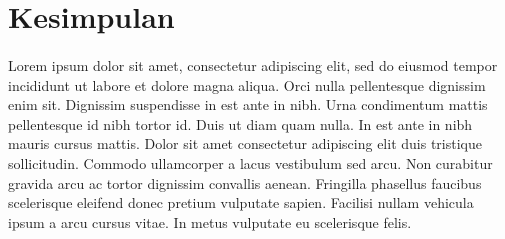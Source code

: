 \section{Kesimpulan}
\paragraph{}Lorem ipsum dolor sit amet, consectetur adipiscing elit, sed do eiusmod tempor incididunt ut labore et dolore magna aliqua. Orci nulla pellentesque dignissim enim sit. Dignissim suspendisse in est ante in nibh. Urna condimentum mattis pellentesque id nibh tortor id. Duis ut diam quam nulla. In est ante in nibh mauris cursus mattis. Dolor sit amet consectetur adipiscing elit duis tristique sollicitudin. Commodo ullamcorper a lacus vestibulum sed arcu. Non curabitur gravida arcu ac tortor dignissim convallis aenean. Fringilla phasellus faucibus scelerisque eleifend donec pretium vulputate sapien. Facilisi nullam vehicula ipsum a arcu cursus vitae. In metus vulputate eu scelerisque felis.